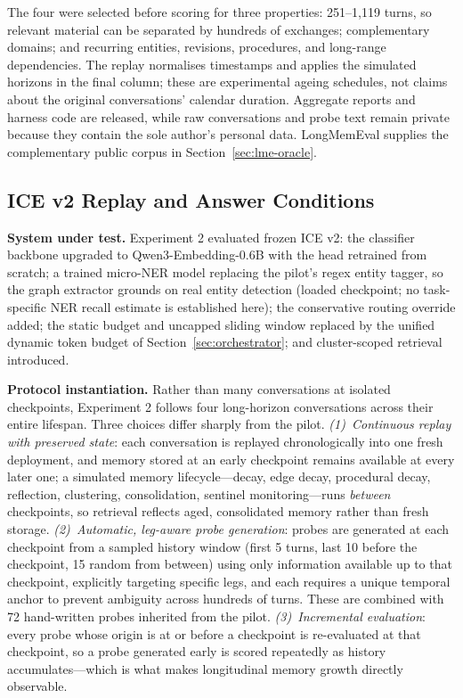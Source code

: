 \documentclass[twoside,11pt]{article}
\begin{document}
The four were selected before scoring for three properties: 251--1{,}119 turns, so relevant material can be separated by hundreds of exchanges; complementary domains; and recurring entities, revisions, procedures, and long-range dependencies. The replay normalises timestamps and applies the simulated horizons in the final column; these are experimental ageing schedules, not claims about the original conversations' calendar duration. Aggregate reports and harness code are released, while raw conversations and probe text remain private because they contain the sole author's personal data. LongMemEval supplies the complementary public corpus in Section~\ref{sec:lme-oracle}.

\subsection{ICE v2 Replay and Answer Conditions}
\label{sec:exp2-env}

\textbf{System under test.} Experiment 2 evaluated frozen ICE v2: the classifier backbone upgraded to Qwen3-Embedding-0.6B with the head retrained from scratch; a trained micro-NER model replacing the pilot's regex entity tagger, so the graph extractor grounds on real entity detection (loaded checkpoint; no task-specific NER recall estimate is established here); the conservative routing override added; the static budget and uncapped sliding window replaced by the unified dynamic token budget of Section~\ref{sec:orchestrator}; and cluster-scoped retrieval introduced.

\textbf{Protocol instantiation.} Rather than many conversations at isolated checkpoints, Experiment 2 follows four long-horizon conversations across their entire lifespan. Three choices differ sharply from the pilot. \emph{(1)~Continuous replay with preserved state}: each conversation is replayed chronologically into one fresh deployment, and memory stored at an early checkpoint remains available at every later one; a simulated memory lifecycle---decay, edge decay, procedural decay, reflection, clustering, consolidation, sentinel monitoring---runs \emph{between} checkpoints, so retrieval reflects aged, consolidated memory rather than fresh storage. \emph{(2)~Automatic, leg-aware probe generation}: probes are generated at each checkpoint from a sampled history window (first 5 turns, last 10 before the checkpoint, 15 random from between) using only information available up to that checkpoint, explicitly targeting specific legs, and each requires a unique temporal anchor to prevent ambiguity across hundreds of turns. These are combined with 72 hand-written probes inherited from the pilot. \emph{(3)~Incremental evaluation}: every probe whose origin is at or before a checkpoint is re-evaluated at that checkpoint, so a probe generated early is scored repeatedly as history accumulates---which is what makes longitudinal memory growth directly observable.
\end{document}
